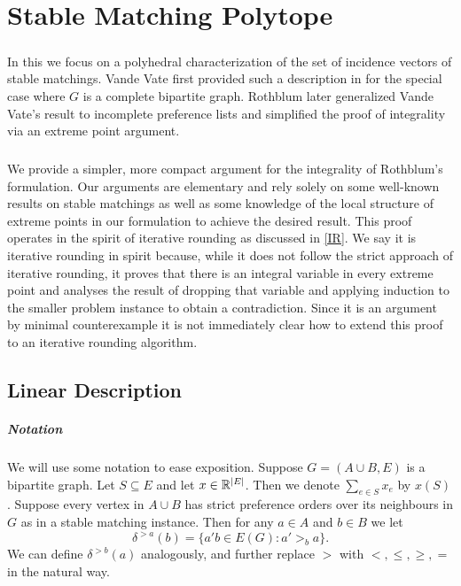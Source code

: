 \chapter{Stable Matching Polytope}
\paragraph{}
In this we focus on a polyhedral characterization of the set of
incidence vectors of stable matchings.  Vande Vate first provided such
a description in \cite{vate1989linear} for the special case where $G$
is a complete bipartite graph.  Rothblum \cite{rothblum1992characterization} later generalized Vande Vate's result to incomplete preference lists and simplified the proof of integrality via an extreme point argument.
\paragraph{}
We provide a simpler, more compact argument for the integrality of Rothblum's formulation. Our arguments are elementary and rely solely on some well-known results on stable matchings as well as some knowledge of the local structure of extreme points in our formulation to achieve the desired result. This proof operates in the spirit of iterative rounding as discussed in \ref{IR}. We say it is iterative rounding in spirit because, while it does not follow the strict approach of iterative rounding, it proves that there is an integral variable in every extreme point and analyses the result of dropping that variable and applying induction to the smaller problem instance to obtain a contradiction. Since it is an argument by minimal counterexample it is not immediately clear how to extend this proof to an iterative rounding algorithm.
\section{Linear Description}
\paragraph{Notation}
We will use some notation to ease exposition. Suppose $G=(A\cup B, E)$ is a bipartite graph. Let $S \subseteq E$ and let $x \in \mathbb{R}^{\left|E\right|}$. Then we denote $\sum_{e\in S} x_e$ by $x(S)$. Suppose every vertex in $A \cup B$ has strict preference orders over its neighbours in $G$ as in a stable matching instance. Then for any $a\in A$ and $b \in B$ we let
$$\delta^{>a}(b) = \{a'b \in E(G): a' >_b a\}.$$
We can define $\delta^{>b}(a)$ analogously, and further replace $>$ with $<, \leq, \geq, =$ in the natural way.
